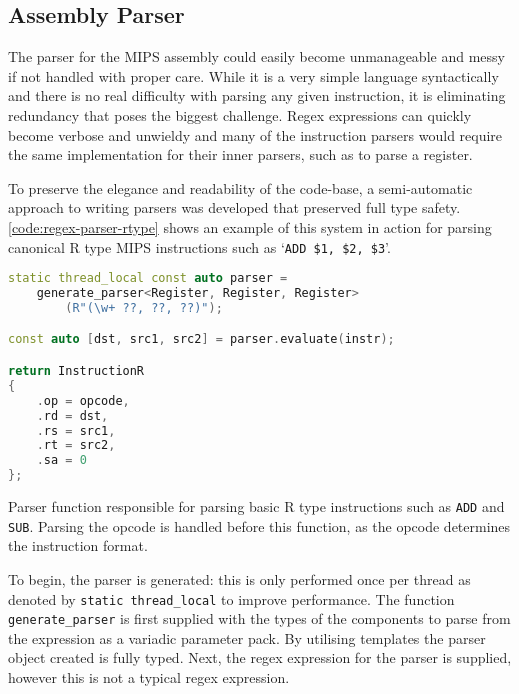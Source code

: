 \subsection{Assembly Parser}

The parser for the MIPS assembly could easily become unmanageable and messy if not handled with proper care. While it is a very simple language syntactically and there is no real difficulty with parsing any given instruction, it is eliminating redundancy that poses the biggest challenge. Regex expressions can quickly become verbose and unwieldy and many of the instruction parsers would require the same implementation for their inner parsers, such as to parse a register.

To preserve the elegance and readability of the code-base, a semi-automatic approach to writing parsers was developed that preserved full type safety. \autoref{code:regex-parser-rtype} shows an example of this system in action for parsing canonical R type MIPS instructions such as `\texttt{ADD \$1, \$2, \$3}'.

\begin{lstfloat}[H]
    \begin{lstlisting}[language=c++]
static thread_local const auto parser =
    generate_parser<Register, Register, Register>
        (R"(\w+ ??, ??, ??)");

const auto [dst, src1, src2] = parser.evaluate(instr);

return InstructionR
{
    .op = opcode,
    .rd = dst,
    .rs = src1,
    .rt = src2,
    .sa = 0
};
    \end{lstlisting}
    \caption{Parser function responsible for parsing basic R type instructions such as \texttt{ADD} and \texttt{SUB}. Parsing the opcode is handled before this function, as the opcode determines the instruction format.}
    \label{code:regex-parser-rtype}
\end{lstfloat}

To begin, the parser is generated: this is only performed once per thread as denoted by \texttt{static thread\_local} to improve performance. The function \texttt{generate\_parser} is first supplied with the types of the components to parse from the expression as a variadic parameter pack. By utilising templates the parser object created is fully typed. Next, the regex expression for the parser is supplied, however this is not a typical regex expression.

